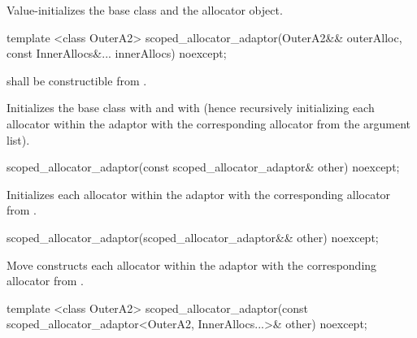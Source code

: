 \begin{itemdescr}
\pnum
\effects Value-initializes the  base class and the  allocator
object.
\end{itemdescr}

%
\begin{itemdecl}
template <class OuterA2>
  scoped_allocator_adaptor(OuterA2&& outerAlloc,
                           const InnerAllocs&... innerAllocs) noexcept;
\end{itemdecl}

\begin{itemdescr}
\pnum
\requires {} shall be constructible from .

\pnum
\effects Initializes the  base class with
 and  with 
(hence recursively initializing each allocator within the adaptor with the corresponding
allocator from the argument list).
\end{itemdescr}

%
\begin{itemdecl}
scoped_allocator_adaptor(const scoped_allocator_adaptor& other) noexcept;
\end{itemdecl}

\begin{itemdescr}
\pnum
\effects Initializes each allocator within the adaptor with the corresponding allocator
from .
\end{itemdescr}

%
\begin{itemdecl}
scoped_allocator_adaptor(scoped_allocator_adaptor&& other) noexcept;
\end{itemdecl}

\begin{itemdescr}
\pnum
\effects Move constructs each allocator within the adaptor with the corresponding allocator
from .
\end{itemdescr}

%
\begin{itemdecl}
template <class OuterA2>
  scoped_allocator_adaptor(const scoped_allocator_adaptor<OuterA2,
                                                          InnerAllocs...>& other) noexcept;
\end{itemdecl}

